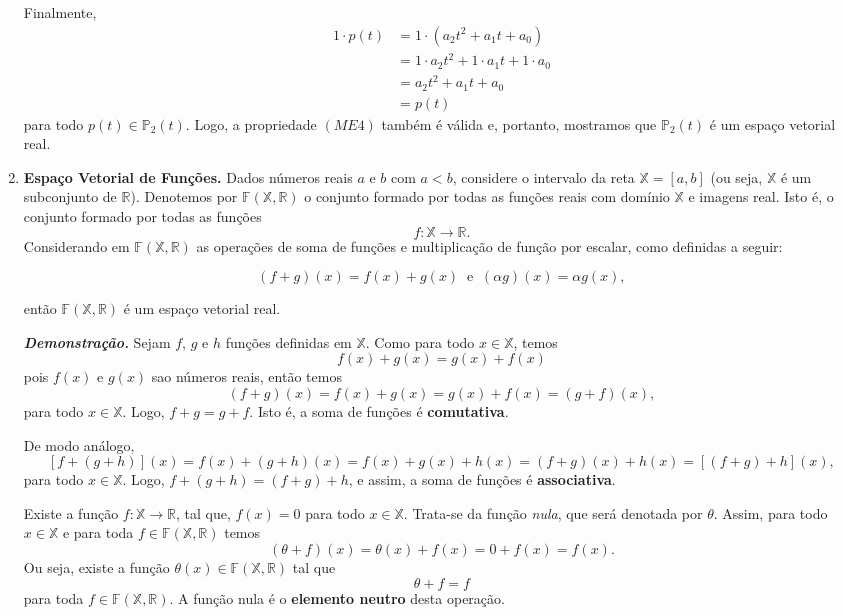 \begin{enumerate}
Finalmente,
\begin{align*}
1 \cdot p(t)&=1 \cdot (a_2t^2+a_1t+ a_0)\\
                  &=1 \cdot a_2t^2+ 1\cdot a_1t+ 1 \cdot a_0\\
                 &= a_2t^2+  a_1t+  a_0\\
                 &=p(t)
\end{align*}
para todo $p(t) \in \mathbb{P}_2(t)$. Logo, a propriedade $(ME4)$ também  é válida e, portanto, mostramos que $\mathbb{P}_2(t)$ é um espaço vetorial real.
\item \textbf{Espaço Vetorial de Funções.} Dados números reais  $a$ e $b$  com $a < b$, considere  o intervalo da reta  $\mathbb{X}=[a,b]$ (ou seja, $\mathbb{X}$ é um subconjunto de $\mathbb{R}$).  Denotemos por  $\mathbb{F}(\mathbb{X}, \mathbb{R})$ o  conjunto formado por todas as  funções reais com domínio $\mathbb{X}$ e imagens real.  Isto é, o  conjunto formado por todas as funções
$$f: \mathbb{X} \rightarrow \mathbb{R}. $$  Considerando em $\mathbb{F}(\mathbb{X}, \mathbb{R})$  as operações de soma de funções e multiplicação de função  por escalar, como   definidas a seguir:

$$(f+g)(x)=f(x)+g(x) \; \; \text{e} \;\; (\alpha g)(x)=\alpha g(x), $$

então $\mathbb{F}(\mathbb{X}, \mathbb{R})$ é um espaço vetorial real.

\textbf{\textit{Demonstração.}} Sejam $f$, $g$ e $h$ funções definidas em $\mathbb{X}$.  Como para todo $ x \in \mathbb{X}$, temos $$f(x)+g(x)=g(x)+f(x)$$ pois $f(x)$  e $g(x)$ sao números reais, então  temos $$(f+g)(x)=f(x)+g(x)=g(x)+f(x)=(g+f)(x),$$ para todo $ x \in \mathbb{X}$. Logo, $f+g=g+f$. Isto é, a soma de funções é \textbf{comutativa}.

De modo análogo,$$[f+(g+h)](x)=f(x)+(g+h)(x)=f(x)+g(x)+h(x)=(f+g)(x)+h(x)=[(f+g)+h](x),$$   para todo $ x \in \mathbb{X}$. Logo, $f+(g+h)=(f+g)+h$, e assim,  a soma de funções é \textbf{associativa}.

Existe a função $f: \mathbb{X} \rightarrow \mathbb{R}$,  tal que,  $f(x)=0$ para todo   $ x \in \mathbb{X}$. Trata-se da função \textit{nula}, que será denotada por $\theta$. Assim, para todo  $ x \in \mathbb{X}$ e para toda $f \in  \mathbb{F}(\mathbb{X}, \mathbb{R})$  temos $$ (\theta+f)(x)
=\theta(x)+f(x)=0+f(x)=f(x).$$ Ou seja, existe a função $\theta(x) \in \mathbb{F}(\mathbb{X}, \mathbb{R})$   tal que $$\theta + f=f$$ para toda $ f \in \mathbb{F}(\mathbb{X}, \mathbb{R})$. A função nula é o \textbf{ elemento neutro} desta operação.


\end{enumerate}
